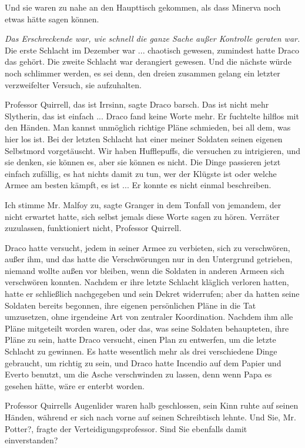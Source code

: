 Und sie waren zu nahe an den Haupttisch gekommen, als dass Minerva noch etwas
hätte sagen können.

\emph{Das Erschreckende war, wie schnell die ganze Sache außer Kontrolle
geraten war.} Die erste Schlacht im Dezember war ... chaotisch gewesen, zumindest
hatte Draco das gehört. Die zweite Schlacht war derangiert gewesen. Und die
nächste würde noch schlimmer werden, es sei denn, den dreien zusammen gelang ein
letzter verzweifelter Versuch, sie aufzuhalten.

\glqq{}Professor Quirrell, das ist Irrsinn\grqq{}, sagte Draco barsch. \glqq{}Das
ist nicht mehr Slytherin, das ist einfach ...\grqq{} Draco fand keine Worte
mehr. Er fuchtelte hilflos mit den Händen. \glqq{}Man kannst unmöglich richtige
Pläne schmieden, bei all dem, was hier los ist. Bei der letzten Schlacht hat
einer meiner Soldaten seinen eigenen Selbstmord vorgetäuscht. Wir haben
Hufflepuffs, die versuchen zu intrigieren, und sie denken, sie können es, aber
sie können es nicht. Die Dinge passieren jetzt einfach zufällig, es hat nichts
damit zu tun, wer der Klügste ist oder welche Armee am besten kämpft, es
ist ...\grqq{} Er konnte es nicht einmal beschreiben.

\glqq{}Ich stimme Mr. Malfoy zu\grqq{}, sagte Granger in dem Tonfall von
jemandem, der nicht erwartet hatte, sich selbst jemals diese Worte sagen zu
hören. \glqq{}Verräter zuzulassen, funktioniert nicht, Professor Quirrell.\grqq{}

Draco hatte versucht, jedem in seiner Armee zu verbieten, sich zu verschwören,
außer ihm, und das hatte die Verschwörungen nur in den Untergrund getrieben,
niemand wollte außen vor bleiben, wenn die Soldaten in anderen Armeen sich
verschwören konnten. Nachdem er ihre letzte Schlacht kläglich verloren hatten,
hatte er schließlich nachgegeben und sein Dekret widerrufen; aber da hatten
seine Soldaten bereits begonnen, ihre eigenen persönlichen Pläne in die Tat
umzusetzen, ohne irgendeine Art von zentraler Koordination. Nachdem ihm alle
Pläne mitgeteilt worden waren, oder das, was seine Soldaten behaupteten, ihre
Pläne zu sein, hatte Draco versucht, einen Plan zu entwerfen, um die letzte
Schlacht zu gewinnen. Es hatte wesentlich mehr als drei verschiedene Dinge
gebraucht, um richtig zu sein, und Draco hatte Incendio auf dem Papier und
Everto benutzt, um die Asche verschwinden zu lassen, denn wenn Papa es gesehen
hätte, wäre er enterbt worden.

Professor Quirrells Augenlider waren halb geschlossen, sein Kinn ruhte auf
seinen Händen, während er sich nach vorne auf seinen Schreibtisch lehnte. \glqq{}
Und Sie, Mr. Potter?\grqq{}, fragte der Verteidigungsprofessor. \glqq{}Sind Sie
ebenfalls damit einverstanden?\grqq{}

